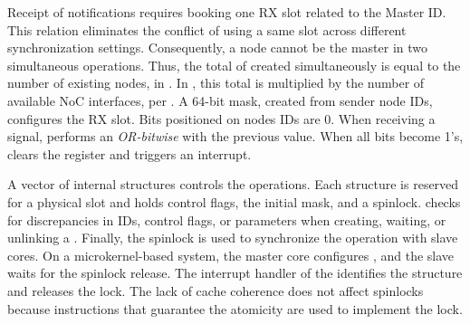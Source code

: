 

				Receipt of notifications requires booking one \cnoc RX slot related to the Master ID. This relation eliminates the conflict of using a same slot across different synchronization settings. Consequently, a node cannot be the master in two simultaneous operations. Thus, the total of \sync created simultaneously is equal to the number of existing nodes,  in \mppa. In \ioclusters, this total is multiplied by the number of available NoC interfaces,  per \dma. A 64-bit mask, created from sender node IDs, configures the RX slot. Bits positioned on nodes IDs are 0. When receiving a signal, \dma performs an \textit{OR-bitwise} with the previous value. When all bits become 1's, \dma clears the register and triggers an interrupt.

				A vector of internal structures controls the operations. Each structure is reserved for a physical slot and holds control flags, the initial mask, and a spinlock. \hal checks for discrepancies in IDs, control flags, or parameters when creating, waiting, or unlinking a \sync. Finally, the spinlock is used to synchronize the operation with slave cores. On a microkernel-based system, the master core configures \sync, and the slave waits for the spinlock release. The interrupt handler of the \sync identifies the structure and releases the lock. The lack of cache coherence does not affect spinlocks because instructions that guarantee the atomicity are used to implement the lock.

